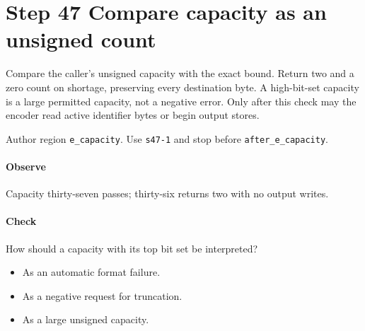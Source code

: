 \section{Step 47 Compare capacity as an unsigned count}\label{cbor-s47}
Compare the caller's unsigned capacity with the exact bound. Return two and a zero count on shortage, preserving every destination byte. A high-bit-set capacity is a large permitted capacity, not a negative error. Only after this check may the encoder read active identifier bytes or begin output stores.

Author region \texttt{e\_capacity}. Use \texttt{s47-1} and stop before \texttt{after\_e\_capacity}. 

\paragraph{Observe} Capacity thirty-seven passes; thirty-six returns two with no output writes.

\paragraph{Check} How should a capacity with its top bit set be interpreted?
\begin{itemize}
\item[A.] As an automatic format failure.
\item[B.] As a negative request for truncation.
\item[C.] As a large unsigned capacity.
\end{itemize}

